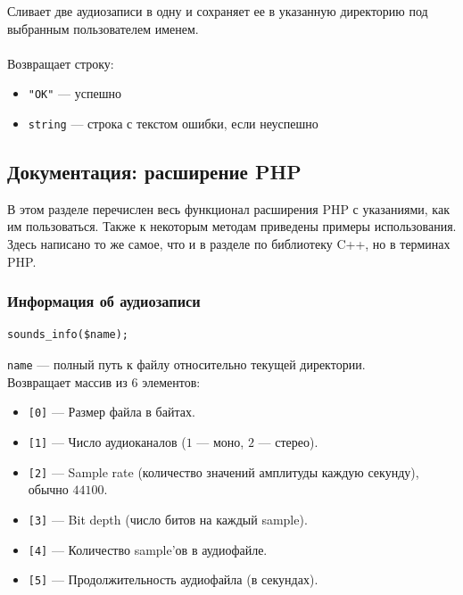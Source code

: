 \documentclass[14pt,a4paper]{article}
\begin{document}
\noindent Сливает две аудиозаписи в одну и сохраняет ее в указанную директорию под выбранным пользователем именем. \\\\
Возвращает строку:
\smallskip
\begin{itemize}
\item \lstinline{"OK"} --- успешно
\item \lstinline{string} --- строка с текстом ошибки, если неуспешно
\end{itemize}

\subsection{Документация: расширение PHP}


В этом разделе перечислен весь функционал расширения PHP с указаниями, как им пользоваться. Также к некоторым методам приведены примеры использования. Здесь написано то же самое, что и в разделе по библиотеку C++, но в терминах PHP.

\subsubsection*{Информация об аудиозаписи}

\begin{lstlisting}
sounds_info($name);
\end{lstlisting}

\lstinline{name} --- полный путь к файлу относительно текущей директории. \\

\noindent Возвращает массив из $6$ элементов:
\smallskip 
\begin{itemize}
\item[] \lstinline{[0]} --- Размер файла в байтах.
\item[] \lstinline{[1]} --- Число аудиоканалов ($1$ --- моно, $2$ --- стерео).
\item[] \lstinline{[2]} --- Sample rate (количество значений амплитуды каждую секунду), обычно $44100$.
\item[] \lstinline{[3]} --- Bit depth (число битов на каждый sample).
\item[] \lstinline{[4]} --- Количество sample'ов в аудиофайле.
\item[] \lstinline{[5]} --- Продолжительность аудиофайла (в секундах).
\end{itemize}
\end{document}
